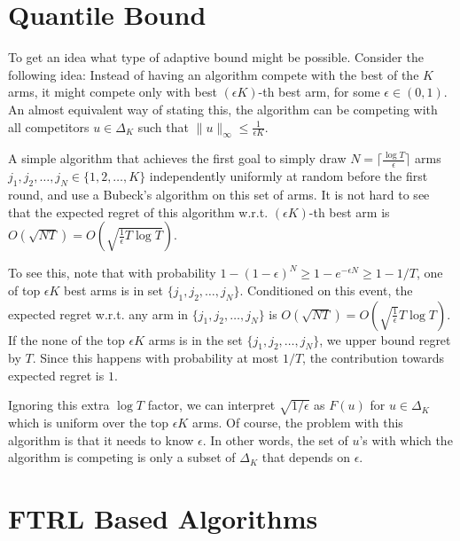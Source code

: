 \documentclass[12pt]{article}
\newcommand{\norm}[1]{\|#1\|}
\begin{document}
\section{Quantile Bound}

To get an idea what type of adaptive bound might be possible. Consider the
following idea: Instead of having an algorithm compete with the best of the $K$
arms, it might compete only with best $(\epsilon K)$-th best arm, for some
$\epsilon \in (0,1)$. An almost equivalent way of stating this, the algorithm
can be competing with all competitors $u \in \Delta_K$ such that
$\norm{u}_\infty \le \frac{1}{\epsilon K}$.

A simple algorithm that achieves the first goal to simply draw $N =
\lceil \frac{\log T}{\epsilon} \rceil$ arms $j_1, j_2, \dots, j_N \in \{1,2, \dots, K\}$
independently uniformly at random before the first round, and use a Bubeck's
algorithm on this set of arms. It is not hard to see that the expected regret
of this algorithm w.r.t. $(\epsilon K)$-th best arm is
$O(\sqrt{N T}) = O \left(\sqrt{\frac{1}{\epsilon} T \log T} \right)$.

To see this, note that with probability $1 - (1-\epsilon)^N \ge 1 -
e^{-\epsilon N} \ge 1 - 1/T$, one of top $\epsilon K$ best arms is in set
$\{j_1, j_2, \dots, j_N\}$. Conditioned on this event, the expected regret
w.r.t.  any arm in $\{j_1, j_2, \dots, j_N\}$ is $O(\sqrt{NT}) =
O(\sqrt{\frac{1}{\epsilon}} T \log T)$.  If the none of the top $\epsilon K$
arms is in the set $\{j_1, j_2, \dots, j_N\}$, we upper bound regret by $T$.
Since this happens with probability at most $1/T$, the contribution towards
expected regret is $1$.

Ignoring this extra $\log T$ factor, we can interpret $\sqrt{1/\epsilon}$ as
$F(u)$ for $u \in \Delta_K$ which is uniform over the top $\epsilon K$ arms.
Of course, the problem with this algorithm is that it needs to know $\epsilon$.
In other words, the set of $u$'s with which the algorithm is competing is only
a subset of $\Delta_K$ that depends on $\epsilon$.

\section{FTRL Based Algorithms}
\end{document}
